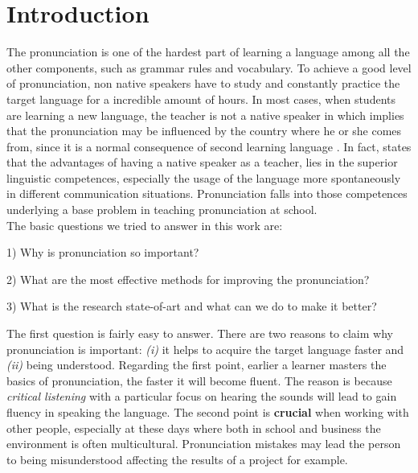 \chapter{Introduction}
The pronunciation is one of the hardest part of learning a language among all the other components, such as grammar rules and vocabulary. To achieve a good level of pronunciation, non native speakers have to study and constantly practice the target language for a incredible amount of hours. In most cases, when students are learning a new language, the teacher is not a native speaker in which implies that the pronunciation may be influenced by the country where he or she comes from, since it is a normal consequence of second learning language \cite{derwing2005second}. In fact, \cite{medgyes2001teacher} states that the advantages of having a native speaker as a teacher, lies in the superior linguistic competences, especially the usage of the language more spontaneously in different communication situations. Pronunciation falls into those competences underlying a base problem in teaching pronunciation at school. \\

\noindent The basic questions we tried to answer in this work are:
\begin{compactitem}
    \item[1)] Why is pronunciation so important?
    \item[2)] What are the most effective methods for improving the pronunciation?
    \item[3)] What is the research state-of-art and what can we do to make it better?
\end{compactitem}

\vspace*{1em}

\noindent The first question is fairly easy to answer. There are two reasons to claim why pronunciation is important: \textit{(i)} it helps to acquire the target language faster and \textit{(ii)} being understood.
Regarding the first point, earlier a learner masters the basics of pronunciation, the faster it will become fluent. The reason is because \textit{critical listening} with a particular focus on hearing the sounds will lead to gain fluency in speaking the language.
The second point is \textbf{crucial} when working with other people, especially at these days where both in school and business the environment is often multicultural. Pronunciation mistakes may lead the person to being misunderstood affecting the results of a project for example. \\

